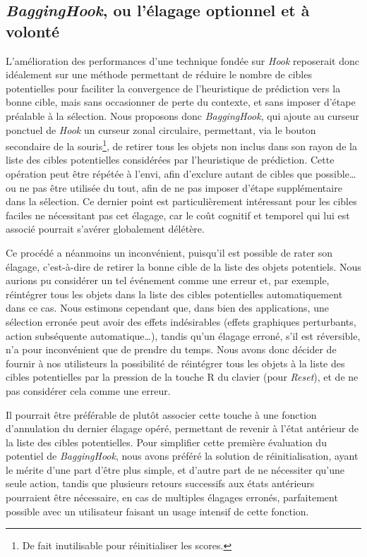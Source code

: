 	\subsection{\emph{BaggingHook}, ou l'élagage optionnel et à volonté}
	L'amélioration des performances d'une technique fondée sur \emph{Hook} reposerait donc idéalement sur une méthode permettant de réduire le nombre de cibles potentielles pour faciliter la convergence de l'heuristique de prédiction vers la bonne cible, mais sans occasionner de perte du contexte, et sans imposer d'étape préalable à la sélection. Nous proposons donc \emph{BaggingHook}, qui ajoute au curseur ponctuel de \emph{Hook} un curseur zonal circulaire, permettant, via le bouton secondaire de la souris\footnote{De fait inutilisable pour réinitialiser les scores.}, de retirer tous les objets non inclus dans son rayon de la liste des cibles potentielles considérées par l'heuristique de prédiction. Cette opération peut être répétée à l'envi, afin d'exclure autant de cibles que possible\ldots{} ou ne pas être utilisée du tout, afin de ne pas imposer d'étape supplémentaire dans la sélection. Ce dernier point est particulièrement intéressant pour les cibles faciles ne nécessitant pas cet élagage, car le coût cognitif et temporel qui lui est associé pourrait s'avérer globalement délétère.
	
	Ce procédé a néanmoins un inconvénient, puisqu'il est possible de \og rater \fg{} son élagage, c'est-à-dire de retirer la bonne cible de la liste des objets potentiels. Nous aurions pu considérer un tel événement comme une erreur et, par exemple, réintégrer tous les objets dans la liste des cibles potentielles automatiquement dans ce cas. Nous estimons cependant que, dans bien des applications, une sélection erronée peut avoir des effets indésirables (effets graphiques perturbants, action subséquente automatique\ldots{}), tandis qu'un élagage erroné, s'il est réversible, n'a pour inconvénient que de prendre du temps. Nous avons donc décider de fournir à nos utilisteurs la possibilité de réintégrer tous les objets à la liste des cibles potentielles par la pression de la touche R du clavier (pour \emph{Reset}), et de ne pas considérer cela comme une erreur.
	
	Il pourrait être préférable de plutôt associer cette touche à une fonction d'annulation du dernier élagage opéré, permettant de revenir à l'état antérieur de la liste des cibles potentielles. Pour simplifier cette première évaluation du potentiel de \emph{BaggingHook}, nous avons préféré la solution de réinitialisation, ayant le mérite d'une part d'être plus simple, et d'autre part de ne nécessiter qu'une seule action, tandis que plusieurs retours successifs aux états antérieurs pourraient être nécessaire, en cas de multiples élagages erronés, parfaitement possible avec un utilisateur faisant un usage intensif de cette fonction.
	

